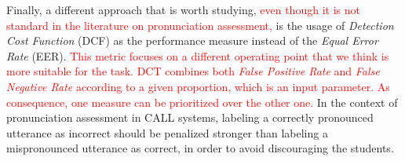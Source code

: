 Finally, a different approach
that is worth studying, \textcolor{red}{even though it is not standard in the literature
on pronunciation assessment, }
is the usage of \textit{Detection Cost Function} (DCF) as the performance measure
instead of the \textit{Equal Error Rate} (EER). \textcolor{red}{
This metric focuses on a different operating point that we think is more suitable for
the task.
DCT combines both \textit{False Positive Rate} and \textit{False Negative Rate}
according to a given proportion, which is an input parameter. As consequence,
one measure can be prioritized over the other one.}
In the context of pronunciation assessment in
CALL systems, labeling a correctly pronounced utterance as incorrect should be
penalized stronger than labeling a mispronounced utterance as correct, in order
to avoid discouraging the students.
